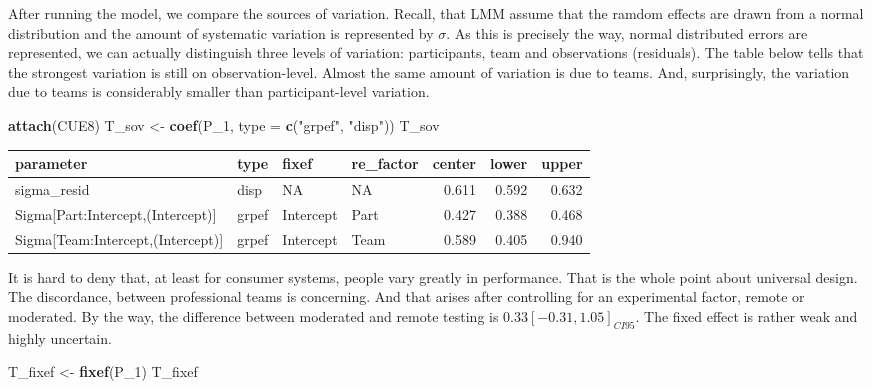 \documentclass[]{svmono}
\newenvironment{Shaded}{\begin{snugshade}}{\end{snugshade}}
\newcommand{\KeywordTok}[1]{\textcolor[rgb]{0.13,0.29,0.53}{\textbf{#1}}}
\newcommand{\DataTypeTok}[1]{\textcolor[rgb]{0.13,0.29,0.53}{#1}}
\newcommand{\DecValTok}[1]{\textcolor[rgb]{0.00,0.00,0.81}{#1}}
\newcommand{\StringTok}[1]{\textcolor[rgb]{0.31,0.60,0.02}{#1}}
\newcommand{\NormalTok}[1]{#1}
\theoremstyle{definition}
\theoremstyle{definition}
\theoremstyle{definition}
\theoremstyle{remark}
\begin{document}
After running the model, we compare the sources of variation. Recall,
that LMM assume that the ramdom effects are drawn from a normal
distribution and the amount of systematic variation is represented by
\(\sigma\). As this is precisely the way, normal distributed errors are
represented, we can actually distinguish three levels of variation:
participants, team and observations (residuals). The table below tells
that the strongest variation is still on observation-level. Almost the
same amount of variation is due to teams. And, surprisingly, the
variation due to teams is considerably smaller than participant-level
variation.

\begin{Shaded}
\begin{Highlighting}[]
\KeywordTok{attach}\NormalTok{(CUE8)}
\NormalTok{T_sov <-}\StringTok{ }\KeywordTok{coef}\NormalTok{(P_}\DecValTok{1}\NormalTok{, }\DataTypeTok{type =} \KeywordTok{c}\NormalTok{(}\StringTok{"grpef"}\NormalTok{, }\StringTok{"disp"}\NormalTok{))}
\NormalTok{T_sov}
\end{Highlighting}
\end{Shaded}

\begin{longtable}[]{@{}llllrrr@{}}
\toprule
parameter & type & fixef & re\_factor & center & lower &
upper\tabularnewline
\midrule
\endhead
sigma\_resid & disp & NA & NA & 0.611 & 0.592 & 0.632\tabularnewline
Sigma{[}Part:Intercept,(Intercept){]} & grpef & Intercept & Part & 0.427
& 0.388 & 0.468\tabularnewline
Sigma{[}Team:Intercept,(Intercept){]} & grpef & Intercept & Team & 0.589
& 0.405 & 0.940\tabularnewline
\bottomrule
\end{longtable}

It is hard to deny that, at least for consumer systems, people vary
greatly in performance. That is the whole point about universal design.
The discordance, between professional teams is concerning. And that
arises after controlling for an experimental factor, remote or
moderated. By the way, the difference between moderated and remote
testing is \(0.33 [-0.31, 1.05]_{CI95}\). The fixed effect is rather
weak and highly uncertain.

\begin{Shaded}
\begin{Highlighting}[]
\NormalTok{T_fixef <-}\StringTok{ }\KeywordTok{fixef}\NormalTok{(P_}\DecValTok{1}\NormalTok{)}
\NormalTok{T_fixef}
\end{Highlighting}
\end{Shaded}
\end{document}
